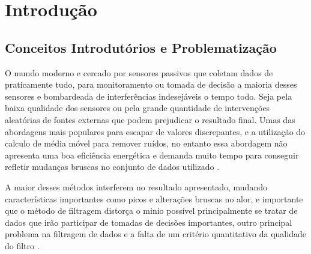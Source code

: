 
\chapter{Introdução}\label{intro}
\section{Conceitos Introdutórios e Problematização}

O mundo moderno e cercado por sensores passivos que coletam dados de praticamente tudo, para monitoramento ou tomada de decisão a maioria desses sensores e bombardeada de interferências indesejáveis o tempo todo. Seja pela baixa qualidade dos sensores ou pela grande quantidade de intervenções aleatórias de fontes externas que podem prejudicar o resultado final. 
Umas das abordagens mais populares para escapar de valores discrepantes, e a utilização do calculo de média móvel para remover ruídos, no entanto essa abordagem não apresenta uma boa eficiência energética e demanda muito tempo para conseguir refletir mudanças bruscas no conjunto de dados utilizado \cite{International_Conference__Zhuang}. 



A maior desses métodos interferem no resultado apresentado, mudando características importantes como picos e alterações bruscas no alor, e importante que o método de filtragem distorça o minio possível principalmente se tratar de dados que irão participar de tomadas de decisões importantes, outro principal problema na filtragem de dados e a falta de um critério quantitativo da qualidade do filtro \cite{kalambet2011noise}.




